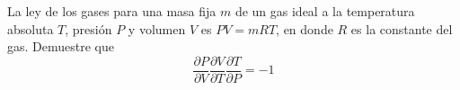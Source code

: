 \item La ley de los gases para una masa fija $m$ de un gas ideal a la temperatura absoluta $T$, presión $P$ y volumen $V$ es $PV = mRT$, en donde $R$ es la constante del gas. Demuestre que
\[ \frac{\partial P}{\partial V} \frac{\partial V}{\partial T} \frac{\partial T}{\partial P} = -1 \]
